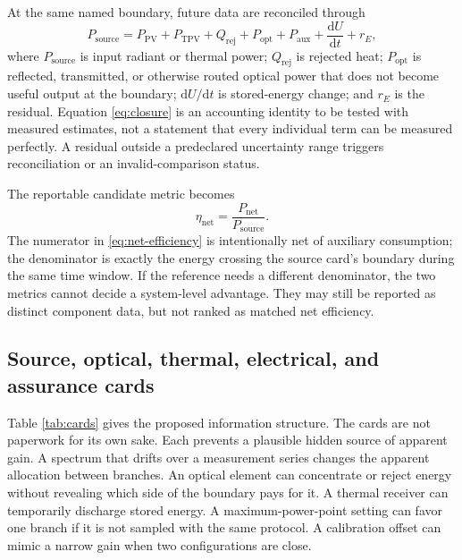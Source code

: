 \documentclass[conference]{../../../../Conference-LaTeX-template_10-17-19/IEEEtran}
\newcommand{\pnet}{P_{\mathrm{net}}}
\newcommand{\psource}{P_{\mathrm{source}}}
\begin{document}
At the same named boundary, future data are reconciled through
\begin{equation}
\psource=P_{\mathrm{PV}}+P_{\mathrm{TPV}}+Q_{\mathrm{rej}}+P_{\mathrm{opt}}+P_{\mathrm{aux}}+\frac{\mathrm{d}U}{\mathrm{d}t}+r_E,
\label{eq:closure}
\end{equation}
where $\psource$ is input radiant or thermal power; $Q_{\mathrm{rej}}$ is rejected heat; $P_{\mathrm{opt}}$ is reflected, transmitted, or otherwise routed optical power that does not become useful output at the boundary; $\mathrm{d}U/\mathrm{d}t$ is stored-energy change; and $r_E$ is the residual. Equation \eqref{eq:closure} is an accounting identity to be tested with measured estimates, not a statement that every individual term can be measured perfectly. A residual outside a predeclared uncertainty range triggers reconciliation or an invalid-comparison status.

The reportable candidate metric becomes
\begin{equation}
\eta_{\mathrm{net}}=\frac{\pnet}{\psource}.
\label{eq:net-efficiency}
\end{equation}
The numerator in \eqref{eq:net-efficiency} is intentionally net of auxiliary consumption; the denominator is exactly the energy crossing the source card's boundary during the same time window. If the reference needs a different denominator, the two metrics cannot decide a system-level advantage. They may still be reported as distinct component data, but not ranked as matched net efficiency.

\subsection{Source, optical, thermal, electrical, and assurance cards}
Table \ref{tab:cards} gives the proposed information structure. The cards are not paperwork for its own sake. Each prevents a plausible hidden source of apparent gain. A spectrum that drifts over a measurement series changes the apparent allocation between branches. An optical element can concentrate or reject energy without revealing which side of the boundary pays for it. A thermal receiver can temporarily discharge stored energy. A maximum-power-point setting can favor one branch if it is not sampled with the same protocol. A calibration offset can mimic a narrow gain when two configurations are close.
\end{document}
